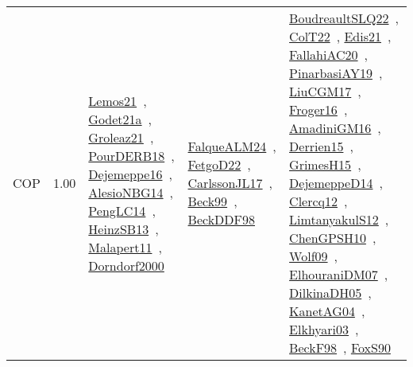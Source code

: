 {\begin{longtable}{p{3cm}r>{\raggedright\arraybackslash}p{6cm}>{\raggedright\arraybackslash}p{6cm}>{\raggedright\arraybackslash}p{8cm}}
\index{COP}\index{CP!COP}COP &  1.00 & \href{../works/Lemos21.pdf}{Lemos21}~\cite{Lemos21}, \href{../works/Godet21a.pdf}{Godet21a}~\cite{Godet21a}, \href{../works/Groleaz21.pdf}{Groleaz21}~\cite{Groleaz21}, \href{../works/PourDERB18.pdf}{PourDERB18}~\cite{PourDERB18}, \href{../works/Dejemeppe16.pdf}{Dejemeppe16}~\cite{Dejemeppe16}, \href{../works/AlesioNBG14.pdf}{AlesioNBG14}~\cite{AlesioNBG14}, \href{../works/PengLC14.pdf}{PengLC14}~\cite{PengLC14}, \href{../works/HeinzSB13.pdf}{HeinzSB13}~\cite{HeinzSB13}, \href{../works/Malapert11.pdf}{Malapert11}~\cite{Malapert11}, \href{../works/Dorndorf2000.pdf}{Dorndorf2000}~\cite{Dorndorf2000} & \href{../works/FalqueALM24.pdf}{FalqueALM24}~\cite{FalqueALM24}, \href{../works/FetgoD22.pdf}{FetgoD22}~\cite{FetgoD22}, \href{../works/CarlssonJL17.pdf}{CarlssonJL17}~\cite{CarlssonJL17}, \href{../works/Beck99.pdf}{Beck99}~\cite{Beck99}, \href{../works/BeckDDF98.pdf}{BeckDDF98}~\cite{BeckDDF98} & \href{../works/BoudreaultSLQ22.pdf}{BoudreaultSLQ22}~\cite{BoudreaultSLQ22}, \href{../works/ColT22.pdf}{ColT22}~\cite{ColT22}, \href{../works/Edis21.pdf}{Edis21}~\cite{Edis21}, \href{../works/FallahiAC20.pdf}{FallahiAC20}~\cite{FallahiAC20}, \href{../works/PinarbasiAY19.pdf}{PinarbasiAY19}~\cite{PinarbasiAY19}, \href{../works/LiuCGM17.pdf}{LiuCGM17}~\cite{LiuCGM17}, \href{../works/Froger16.pdf}{Froger16}~\cite{Froger16}, \href{../works/AmadiniGM16.pdf}{AmadiniGM16}~\cite{AmadiniGM16}, \href{../works/Derrien15.pdf}{Derrien15}~\cite{Derrien15}, \href{../works/GrimesH15.pdf}{GrimesH15}~\cite{GrimesH15}, \href{../works/DejemeppeD14.pdf}{DejemeppeD14}~\cite{DejemeppeD14}, \href{../works/Clercq12.pdf}{Clercq12}~\cite{Clercq12}, \href{../works/LimtanyakulS12.pdf}{LimtanyakulS12}~\cite{LimtanyakulS12}, \href{../works/ChenGPSH10.pdf}{ChenGPSH10}~\cite{ChenGPSH10}, \href{../works/Wolf09.pdf}{Wolf09}~\cite{Wolf09}, \href{../works/ElhouraniDM07.pdf}{ElhouraniDM07}~\cite{ElhouraniDM07}, \href{../works/DilkinaDH05.pdf}{DilkinaDH05}~\cite{DilkinaDH05}, \href{../works/KanetAG04.pdf}{KanetAG04}~\cite{KanetAG04}, \href{../works/Elkhyari03.pdf}{Elkhyari03}~\cite{Elkhyari03}, \href{../works/BeckF98.pdf}{BeckF98}~\cite{BeckF98}, \href{../works/FoxS90.pdf}{FoxS90}~\cite{FoxS90}\\

\end{longtable}}
